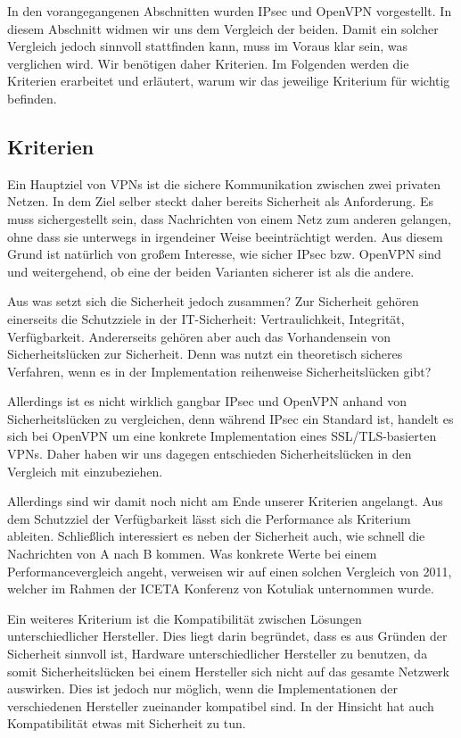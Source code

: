 \documentclass[12pt]{scrartcl}
\begin{document}
In den vorangegangenen Abschnitten wurden IPsec und OpenVPN vorgestellt. In diesem Abschnitt widmen wir uns dem Vergleich der beiden. Damit ein solcher Vergleich jedoch sinnvoll stattfinden kann, muss im Voraus klar sein, was verglichen wird. Wir benötigen daher Kriterien. Im Folgenden werden die Kriterien erarbeitet und erläutert, warum wir das jeweilige Kriterium für wichtig befinden.

\subsection{Kriterien}
Ein Hauptziel von VPNs ist die sichere Kommunikation zwischen zwei privaten Netzen. In dem Ziel selber steckt daher bereits Sicherheit als Anforderung. Es muss sichergestellt sein, dass Nachrichten von einem Netz zum anderen gelangen, ohne dass sie unterwegs in irgendeiner Weise beeinträchtigt werden. Aus diesem Grund ist natürlich von großem Interesse, wie sicher IPsec bzw. OpenVPN sind und weitergehend, ob eine der beiden Varianten sicherer ist als die andere.

Aus was setzt sich die Sicherheit jedoch zusammen? Zur Sicherheit gehören einerseits die Schutzziele in der IT-Sicherheit: Vertraulichkeit, Integrität, Verfügbarkeit. Andererseits gehören aber auch das Vorhandensein von Sicherheitslücken zur Sicherheit. Denn was nutzt ein theoretisch sicheres Verfahren, wenn es in der Implementation reihenweise Sicherheitslücken gibt?

Allerdings ist es nicht wirklich gangbar IPsec und OpenVPN anhand von Sicherheitslücken zu vergleichen, denn während IPsec ein Standard ist\cite{RFC4301}, handelt es sich bei OpenVPN um eine konkrete Implementation eines SSL/TLS-basierten VPNs\cite{Kotuliak2011}. Daher haben wir uns dagegen entschieden Sicherheitslücken in den Vergleich mit einzubeziehen.

Allerdings sind wir damit noch nicht am Ende unserer Kriterien angelangt. Aus dem Schutzziel der Verfügbarkeit lässt sich die Performance als Kriterium ableiten. Schließlich interessiert es neben der Sicherheit auch, wie schnell die Nachrichten von A nach B kommen. Was konkrete Werte bei einem Performancevergleich angeht, verweisen wir auf einen solchen Vergleich von 2011, welcher im Rahmen der ICETA Konferenz von Kotuliak\cite{Kotuliak2011} unternommen wurde.

Ein weiteres Kriterium ist die Kompatibilität zwischen Lösungen unterschiedlicher Hersteller. Dies liegt darin begründet, dass es aus Gründen der Sicherheit sinnvoll ist, Hardware unterschiedlicher Hersteller zu benutzen, da somit Sicherheitslücken bei einem Hersteller sich nicht auf das gesamte Netzwerk auswirken. Dies ist jedoch nur möglich, wenn die Implementationen der verschiedenen Hersteller zueinander kompatibel sind. In der Hinsicht hat auch Kompatibilität etwas mit Sicherheit zu tun.
\end{document}
